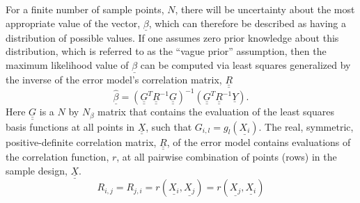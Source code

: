 For a finite number of sample points, $N$, there will be uncertainty
about the most appropriate value of the vector, $\underline{\beta}$, 
which can therefore be described as having a distribution of possible
values.  If one assumes zero prior knowledge about this distribution, 
which is referred to as the ``vague prior'' assumption, then the maximum
likelihood value of $\underline{\beta}$ can be computed via least 
squares generalized by the inverse of the error model's correlation 
matrix, $\underline{\underline{R}}$ 
\begin{displaymath}
\underline{\hat{\beta}}=\left(\underline{\underline{G}}^T\underline{\underline{R}}^{-1}\underline{\underline{G}}\right)^{-1}\left(\underline{\underline{G}}^T\underline{\underline{R}}^{-1}\underline{Y}\right).
\end{displaymath}
Here $\underline{\underline{G}}$ is a $N$ by $N_\beta$ matrix that 
contains the evaluation of the least 
squares basis functions at all points in $\underline{\underline{X}}$, 
such that $G_{i,l}=g_l\left(\underline{X_i}\right)$.  The real, symmetric, 
positive-definite correlation matrix, $\underline{\underline{R}}$, of the 
error model contains evaluations of the correlation function, $r$, at all 
pairwise combination of points (rows) in the sample design, 
$\underline{\underline{X}}$.
\begin{displaymath}
R_{i,j}=R_{j,i}=r\left(\underline{X_i},\underline{X_j}\right)=r\left(\underline{X_j},\underline{X_i}\right)
\end{displaymath}

